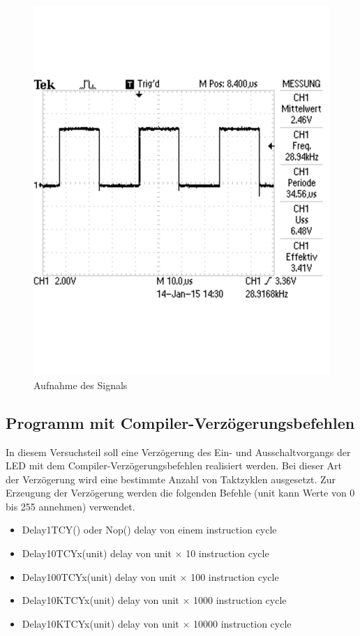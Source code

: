 \documentclass[12pt,a4paper]{article}
\begin{document}
\begin{figure}[H] 
  \centering 	
    \includegraphics[trim = 0mm 50mm 0mm 50mm, clip, scale = 0.4]{TEK0001.pdf}
  	\caption[Aufnahme des Signals]{Aufnahme des Signals} 
  \label{fig:g_2}
\end{figure}

\subsection{Programm mit Compiler-Verzögerungsbefehlen}

In diesem Versuchsteil soll eine Verzögerung des Ein- und Ausschaltvorgangs der LED mit dem Compiler-Verzögerungsbefehlen realisiert werden. Bei dieser Art der Verzögerung wird eine bestimmte Anzahl von Taktzyklen ausgesetzt. Zur Erzeugung der Verzögerung werden die folgenden Befehle (unit kann Werte von 0 bis 255 annehmen) verwendet.

\begin{itemize}
\item	Delay1TCY() oder Nop() delay von einem instruction cycle

\item	Delay10TCYx(unit) delay von unit $\times$ 10 instruction cycle

\item	Delay100TCYx(unit) delay von unit $\times$ 100 instruction cycle

\item	Delay10KTCYx(unit) delay von unit $\times$ 1000 instruction cycle

\item	Delay10KTCYx(unit) delay von unit $\times$ 10000 instruction cycle

\end{itemize}
\end{document}
